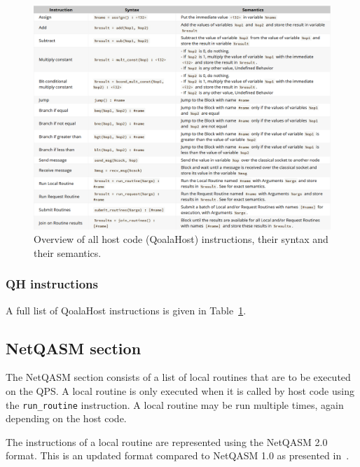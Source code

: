 \begin{figure}
    \centering
    \includegraphics[scale=0.35]{figures/qoala/qh_table.png}
    \caption{Overview of all host code (QoalaHost) instructions, their syntax and their semantics.}
    \label{qoala:fig:app:qh_table}
\end{figure}

\subsubsection{QH instructions}
A full list of QoalaHost instructions is given in Table~\ref{qoala:fig:app:qh_table}.


\subsection{NetQASM section}
\label{qoala:sec:app:netqasm}
The NetQASM section consists of a list of local routines that are to be executed on the QPS.
A local routine is only executed when it is called by host code using the \texttt{run\_routine} instruction. A local routine may be run multiple times, again depending on the host code.

The instructions of a local routine are represented using the NetQASM 2.0 format.
This is an updated format compared to NetQASM 1.0 as presented in~\cite{dahlberg2022netqasm}.

